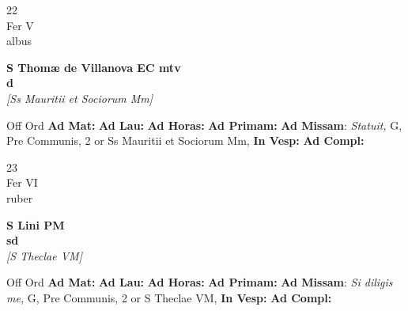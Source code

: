 \documentclass[10pt, openany]{book}
\begin{document}
        \begin{center}
            \begin{minipage}{3.5in}
                \vspace{2em}
                \begin{minipage}{0.5in}
                    {\Huge 22} \\
                    {\normalsize Fer V} \\
                    {\normalsize albus}
                \end{minipage}
                \begin{minipage}{3.0in}
                    \textbf{ \large S Thomæ de Villanova EC mtv \\
                    \textnormal{\normalsize d}} \\ \textit{[Ss Mauritii et Sociorum Mm]} \\ 
                \end{minipage}
                \begin{justify}Off Ord
                    \textbf{Ad Mat: }
                    \textbf{Ad Lau: }
                    \textbf{Ad Horas: }
                    \textbf{Ad Primam: }\textbf{Ad Missam}: \textit{Statuit,} G, Pre Communis, 2 or Ss Mauritii et Sociorum Mm,  
                    \textbf{In Vesp: }
                    \textbf{Ad Compl: }
                \end{justify}
            \end{minipage}
        \end{center}
    
        \begin{center}
            \begin{minipage}{3.5in}
                \vspace{2em}
                \begin{minipage}{0.5in}
                    {\Huge 23} \\
                    {\normalsize Fer VI} \\
                    {\normalsize ruber}
                \end{minipage}
                \begin{minipage}{3.0in}
                    \textbf{ \large S Lini PM \\
                    \textnormal{\normalsize sd}} \\ \textit{[S Theclae VM]} \\ 
                \end{minipage}
                \begin{justify}Off Ord
                    \textbf{Ad Mat: }
                    \textbf{Ad Lau: }
                    \textbf{Ad Horas: }
                    \textbf{Ad Primam: }\textbf{Ad Missam}: \textit{Si diligis me,} G, Pre Communis, 2 or S Theclae VM,  
                    \textbf{In Vesp: }
                    \textbf{Ad Compl: }
                \end{justify}
            \end{minipage}
        \end{center}
    
\end{document}
